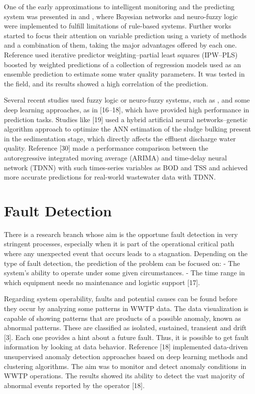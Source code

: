 One of the early approximations to intelligent monitoring and the predicting system was presented in \cite{Sanguesa2000} and \cite{Haggege2005}, where Bayesian networks and neuro-fuzzy logic were implemented to fulfill limitations of rule-based systems. Further works started to focus their attention on variable prediction using a variety of methods and a combination of them, taking the major advantages offered by each one. Reference \cite{Qin2012} used iterative predictor weighting–partial least squares (IPW–PLS) boosted by weighted predictions of a collection of regression models used as an ensemble prediction to estimate some water quality parameters. It was tested in the field, and its results showed a high correlation of the prediction. 

Several recent studies used fuzzy logic or neuro-fuzzy systems, such as \cite{Nourani2018,Nadiri2018,Han2018}, and some deep learning approaches, as in [16–18], which have provided high performance in prediction tasks. Studies like [19] used a hybrid artificial neural networks–genetic algorithm approach to optimize the ANN estimation of the sludge bulking present in the sedimentation stage, which directly affects the effluent discharge water quality. Reference [30] made a performance comparison between the autoregressive integrated moving average (ARIMA) and time-delay neural network (TDNN) with such times-series variables as BOD and TSS and achieved more accurate predictions for real-world wastewater data with TDNN.

\section{Fault Detection}
\label{s:RelatedWorks-faultDetection}

There is a research branch whose aim is the opportune fault detection in very stringent processes, especially when it is part of the operational critical path where any unexpected event that occurs leads to a stagnation. Depending on the type of fault detection, the prediction of the problem can be focused on:
- The system’s ability to operate under some given circumstances.
- The time range in which equipment needs no maintenance and logistic support [17].

Regarding system operability, faults and potential causes can be found before they occur by analyzing some patterns in WWTP data. The data visualization is capable of showing patterns that are products of a possible anomaly, known as abnormal patterns. These are classified as isolated, sustained, transient and drift [3]. Each one provides a hint about a future fault. Thus, it is possible to get fault information by looking at data behavior. Reference [18] implemented data-driven unsupervised anomaly detection approaches based on deep learning methods and clustering algorithms. The aim was to monitor and detect anomaly conditions in WWTP operations. The results showed its ability to detect the vast majority of abnormal events reported by the operator [18]. 

